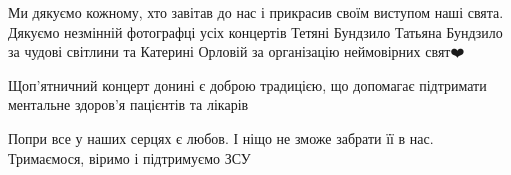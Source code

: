 Ми дякуємо кожному, хто завітав до нас і прикрасив своїм виступом наші свята.
Дякуємо незмінній фотографці усіх концертів Тетяні Бундзило Татьяна Бундзило за
чудові світлини та Катерині Орловій за організацію неймовірних свят❤️

Щоп'ятничний концерт донині є доброю традицією, що допомагає підтримати
ментальне здоров'я пацієнтів та лікарів 🙌

Попри все у наших серцях є любов. І ніщо не зможе забрати її в нас. Тримаємося,
віримо і підтримуємо ЗСУ 💙💛

